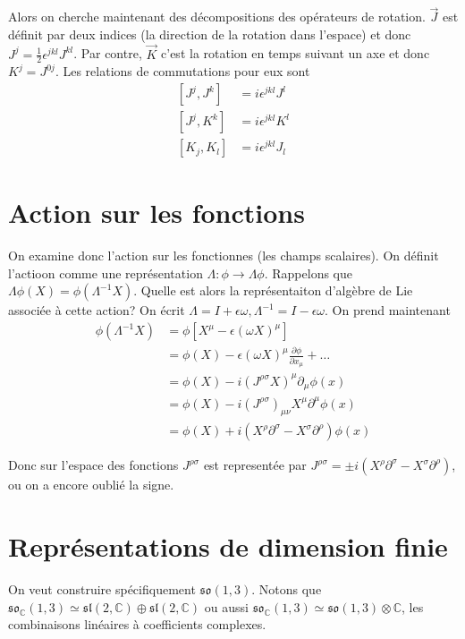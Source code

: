 \documentclass[10pt]{report}
\newcommand{\pd}[2]{\frac{\partial #1}{\partial#2}}
\begin{document}
Alors on cherche maintenant des d\'ecompositions des op\'erateurs de rotation. $\vec{J}$ est d\'efinit par deux indices (la direction de la rotation dans l'espace) et donc $J^j = \frac{1}{2}\epsilon^{jkl}J^{kl}$. Par contre, $\vec{K}$ c'est la rotation en temps suivant un axe et donc $K^j = J^{0j}$. Les relations de commutations pour eux sont
\begin{align}
    \left[ J^j, J^k \right] &= i\epsilon^{jkl}J^l\\
    \left[ J^j, K^k \right] &= i\epsilon^{jkl}K^l\\
    \left[ K_j, K_l \right] &= i\epsilon^{jkl}J_l
\end{align}

\section{Action sur les fonctions}

On examine donc l'action sur les fonctionnes (les champs scalaires). On d\'efinit l'actioon comme une repr\'esentation $\Lambda: \phi \to \Lambda \phi$. Rappelons que $\Lambda \phi(X) = \phi(\Lambda^{-1}X)$. Quelle est alors la repr\'esentaiton d'alg\`ebre de Lie associ\'ee \`a cette action? On \'ecrit $\Lambda = I + \epsilon \omega, \Lambda^{-1} = I - \epsilon \omega$. On prend maintenant
\begin{align}
    \phi(\Lambda^{-1}X) &= \phi\left[ X^\mu - \epsilon(\omega X)^\mu \right]\\
    &= \phi(X) - \epsilon\left( \omega X \right)^\mu\pd{\phi}{x_\mu}+\dots\\
    &= \phi(X) - i\left( J^{\rho\sigma}X \right)^\mu\partial_\mu \phi(x)\\
    &= \phi(X) - i\left( J^{\rho\sigma} \right)_{\mu\nu}X^\mu\partial^\mu \phi(x)\\
    &= \phi(X) + i\left( X^\rho\partial^\sigma - X^\sigma\partial^\rho \right)\phi(x)
\end{align}

Donc sur l'espace des fonctions $J^{\rho\sigma}$ est represent\'ee par $J^{\rho\sigma} = \pm i\left( X^\rho\partial^\sigma - X^\sigma\partial^\rho \right)$, ou on a encore oubli\'e la signe.

\section{Repr\'esentations de dimension finie}

On veut construire sp\'ecifiquement $\mathfrak{so}(1,3)$. Notons que $\mathfrak{so}_{\mathbb{C}}(1,3) \simeq \mathfrak{sl}(2,\mathbb{C}) \oplus \mathfrak{sl}(2,\mathbb{C})$ ou aussi $\mathfrak{so}_\mathbb{C}(1,3) \simeq \mathfrak{so}(1,3) \otimes \mathbb{C}$, les combinaisons lin\'eaires \`a coefficients complexes.
\end{document}
